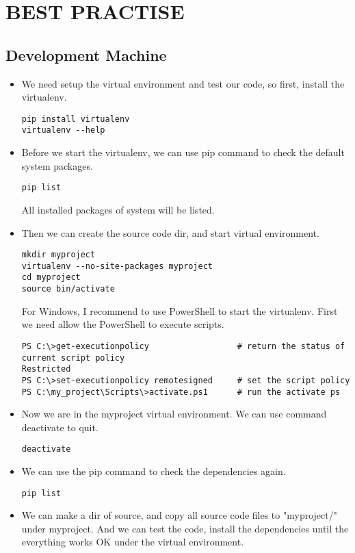 \newpage
\section{BEST PRACTISE}
\subsection{Development Machine}
\begin{itemize}
\item
We need setup the virtual environment and test our code, so first, install the virtualenv.
\begin{lstlisting}
pip install virtualenv
virtualenv --help
\end{lstlisting}
\item
Before we start the virtualenv, we can use pip command to check the default system packages.
\begin{lstlisting}
pip list
\end{lstlisting}
All installed packages of system will be listed.
\item
Then we can create the source code dir, and start virtual environment.
\begin{lstlisting}
mkdir myproject
virtualenv --no-site-packages myproject 
cd myproject
source bin/activate
\end{lstlisting}
For Windows, I recommend to use PowerShell to start the virtualenv. First we need allow the PowerShell to execute scripts.
\begin{lstlisting}
PS C:\>get-executionpolicy                  # return the status of current script policy
Restricted
PS C:\>set-executionpolicy remotesigned     # set the script policy
PS C:\my_project\Scripts\>activate.ps1      # run the activate ps
\end{lstlisting}
\item
Now we are in the myproject virtual environment. We can use command deactivate to quit.
\begin{lstlisting}
deactivate
\end{lstlisting}
\item
We can use the pip command to check the dependencies again.
\begin{lstlisting}
pip list
\end{lstlisting}
\item
We can make a dir of source, and copy all source code files to "myproject/" under myproject.
And we can test the code, install the dependencies until the everything works OK under the virtual environment. \\

\end{itemize}
